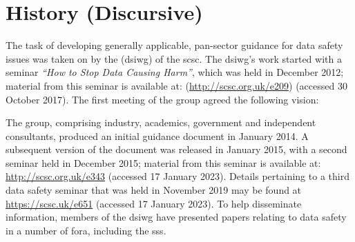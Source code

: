 %
%
\section{ History (Discursive)} \label{bkm:history}


The task of developing generally applicable, pan-sector guidance for data safety issues was taken on by the (\gls{dsiwg}) of the \gls{scsc}. The \gls{dsiwg}'s work started with a seminar \textit{``How to Stop Data Causing Harm''}, which was held in December 2012; material from this seminar is available at: (\href{http://scsc.org.uk/e209}{http://scsc.org.uk/e209}) (accessed 30 October 2017). The first meeting of the group agreed the following vision: 

\begin{quote}
\end{quote}

The group, comprising industry, academics, government and independent consultants,
produced an initial guidance document in January 2014.
A subsequent version of the document was released in January 2015,
with a second seminar  held in December 2015;
material from this seminar is available at: \href{http://scsc.org.uk/e343}{http://scsc.org.uk/e343} (accessed 17 January 2023).
Details pertaining to a third data safety seminar  that was held in November 2019 may be found at
\href{https://scsc.uk/e651}{https://scsc.uk/e651}
(accessed 17 January 2023).
To help disseminate information, members of the \gls{dsiwg} have presented papers relating to data safety in a number of fora,
including the \gls{sss}.


